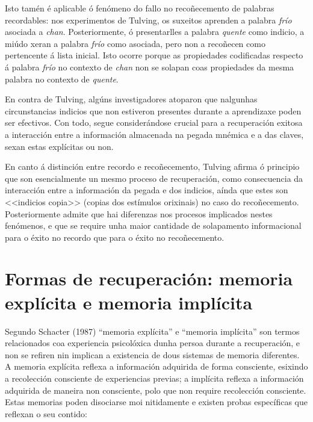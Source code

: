 \documentclass[a4paper,11pt]{article}
\begin{document}
Isto tamén é aplicable ó fenómeno do fallo no recoñecemento de palabras recordables: nos experimentos de Tulving, os suxeitos aprenden a palabra \textit{frío} asociada a \textit{chan}. Posteriormente, ó presentarlles a palabra \textit{quente} como indicio, a miúdo xeran a palabra \textit{frío} como asociada, pero non a recoñecen como pertencente á lista inicial. Isto ocorre porque as propiedades codificadas respecto á palabra \textit{frío} no contexto de \textit{chan} non se solapan coas propiedades da mesma palabra no contexto de \textit{quente}. 

En contra de Tulving, algúns investigadores atoparon que nalgunhas circunstancias indicios que non estiveron presentes durante a aprendizaxe poden ser efectivos. Con todo, segue considerándose crucial para a recuperación exitosa a interacción entre a información almacenada na pegada mnémica e a das claves, sexan estas explícitas ou non.

En canto á distinción entre recordo e recoñecemento, Tulving afirma ó principio que son esencialmente un mesmo proceso de recuperación, como consecuencia da interacción entre a información da pegada e dos indicios, aínda que estes son <<indicios copia>> (copias dos estímulos orixinais) no caso do recoñecemento. Posteriormente admite que hai diferenzas nos procesos implicados nestes fenómenos, e que se require unha maior cantidade de solapamento informacional para o éxito no recordo que para o éxito no recoñecemento.

\section{Formas de recuperación: memoria explícita e memoria implícita}
Segundo Schacter (1987) ``memoria explícita'' e ``memoria implícita'' son termos relacionados coa experiencia psicolóxica dunha persoa durante a recuperación, e non se refiren nin implican a existencia de dous sistemas de memoria diferentes. A memoria explícita reflexa a información adquirida de forma consciente, esixindo a recolección consciente de experiencias previas; a implícita reflexa a información adquirida de maneira non consciente, polo que non require recolección consciente. Estas memorias poden disociarse moi nitidamente e existen probas específicas que reflexan o seu contido:
\end{document}

